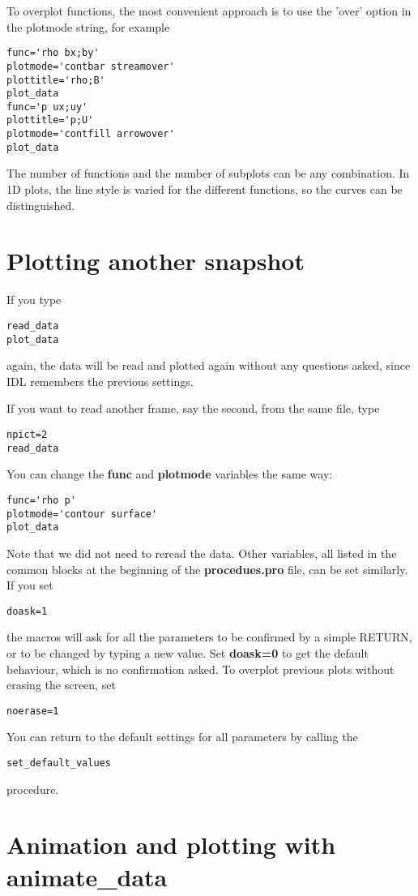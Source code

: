 \documentclass{article}
\begin{document}
To overplot functions, the most convenient approach
is to use the 'over' option in the plotmode string, for example
\begin{verbatim}
func='rho bx;by'
plotmode='contbar streamover'
plottitle='rho;B'
plot_data
func='p ux;uy'
plottitle='p;U'
plotmode='contfill arrowover'
plot_data
\end{verbatim}
The number of functions and the number of subplots can be any combination.
In 1D plots, the line style is varied for the different 
functions, so the curves can be distinguished.

\section{Plotting another snapshot \label{s-plot-another}}

   If you type
\begin{verbatim}
read_data
plot_data
\end{verbatim}
   again, the data will be read and plotted again without any questions asked,
   since IDL remembers the previous settings. 

   If you want to read another frame, say the second, from the same file, type
\begin{verbatim}
npict=2
read_data
\end{verbatim}
   You can change the {\bf func} and {\bf plotmode} variables the same way:
\begin{verbatim}
func='rho p'
plotmode='contour surface'
plot_data
\end{verbatim}
   Note that we did not need to reread the data.
   Other variables, all listed in the common blocks at the beginning of the
   {\bf procedues.pro} file, can be set similarly.
   If you set
\begin{verbatim}
doask=1
\end{verbatim}
   the macros will ask for all the parameters to be confirmed by a simple
   RETURN, or to be changed by typing a new value. Set {\bf doask=0} to
   get the default behaviour, which is no confirmation asked.
   To overplot previous plots without erasing the screen, set
\begin{verbatim}
noerase=1
\end{verbatim}
   You can return to the default settings for all parameters by calling the
\begin{verbatim}
set_default_values
\end{verbatim}
   procedure.

\section{Animation and plotting with animate\_data \label{s-animate}}
\end{document}
